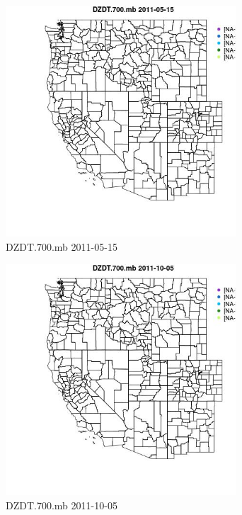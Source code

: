 \begin{figure} 
\centering  
\includegraphics[width=0.77\textwidth]{Code_Outputs/ML_input_report_ML_input_PM25_Step5_part_d_de_duplicated_aves_ML_input_MapObsDZDT700mb2011-05-15.jpg} 
\caption{\label{fig:ML_input_report_ML_input_PM25_Step5_part_d_de_duplicated_aves_ML_inputMapObsDZDT700mb2011-05-15}DZDT.700.mb 2011-05-15} 
\end{figure} 
 

\begin{figure} 
\centering  
\includegraphics[width=0.77\textwidth]{Code_Outputs/ML_input_report_ML_input_PM25_Step5_part_d_de_duplicated_aves_ML_input_MapObsDZDT700mb2011-10-05.jpg} 
\caption{\label{fig:ML_input_report_ML_input_PM25_Step5_part_d_de_duplicated_aves_ML_inputMapObsDZDT700mb2011-10-05}DZDT.700.mb 2011-10-05} 
\end{figure} 
 

